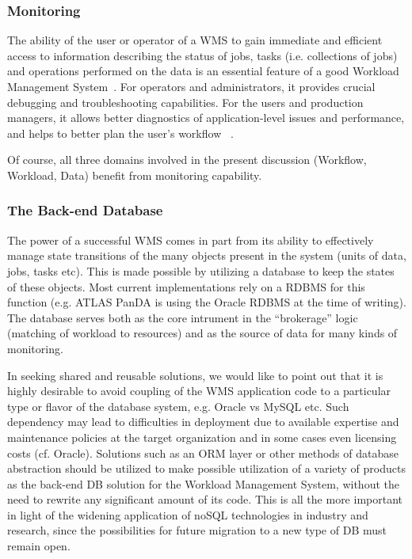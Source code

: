 \subsubsection{Monitoring}
The ability of the user or operator of a WMS to gain immediate and efficient access to information describing the status of jobs, tasks (i.e. collections of jobs) and operations performed on the data
is an essential feature of a good Workload Management System~\cite{pandamon_chep10}. For operators and administrators, it provides crucial debugging and troubleshooting
capabilities. For the users and production managers, it allows better diagnostics of application-level issues and performance, and helps to better plan the user's workflow
~\cite{pandamon_isgc14}.

Of course, all three domains involved in the present discussion (Workflow, Workload, Data) benefit from monitoring capability.

\subsubsection{The Back-end Database}
The power of a successful WMS comes in part from its ability to effectively manage state transitions of the many objects present
in the system (units of data, jobs, tasks etc). This is made possible by utilizing a database to keep the states of these objects.
Most current implementations rely on a RDBMS for this function (e.g. ATLAS PanDA is using the Oracle RDBMS at the time of writing).
The database serves both as the core intrument in the ``brokerage'' logic (matching of workload to resources) and as the source
of data for many kinds of monitoring.

In seeking shared and reusable solutions, we would like to point out that it is highly desirable to avoid coupling of the WMS application code to a particular
type or flavor of the database system, e.g. Oracle vs MySQL etc. Such dependency may lead to difficulties in deployment due to available
expertise and maintenance policies at the target organization and in some cases even licensing costs (cf. Oracle). Solutions such as an ORM layer
or other methods of database abstraction
should be utilized to make possible utilization of a variety of  products as the back-end DB solution for the Workload Management System,
without the need to rewrite any significant amount of its code. This is all the more important in light of the widening application of noSQL
technologies in industry and research, since the possibilities for future migration to a new type of DB must remain open.


